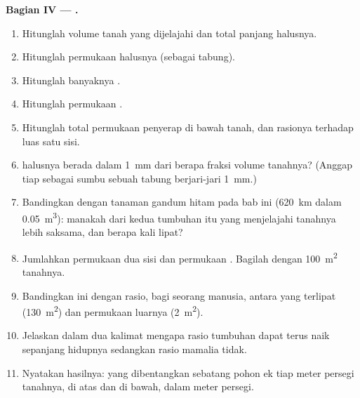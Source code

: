 \begin{problem}
\medskip
\noindent\textbf{Bagian IV --- .}
\begin{enumerate}[resume]
  \item Hitunglah volume tanah yang dijelajahi dan total panjang 
        halusnya.
  \item Hitunglah permukaan  halusnya (sebagai tabung).
  \item Hitunglah banyaknya .
  \item Hitunglah permukaan .
  \item Hitunglah total permukaan penyerap di bawah tanah, dan
        rasionya terhadap luas  satu sisi.
  \item {} halusnya berada dalam \qty{1}{mm} dari berapa fraksi
        volume tanahnya? (Anggap tiap  sebagai sumbu sebuah tabung
        berjari-jari \qty{1}{mm}.)
  \item Bandingkan dengan tanaman gandum hitam pada bab ini
        (\qty{620}{km}  dalam \qty{0.05}{m^3}): manakah dari kedua
        tumbuhan itu yang menjelajahi tanahnya lebih saksama, dan
        berapa kali lipat?
  \item Jumlahkan permukaan  dua sisi dan permukaan .
        Bagilah dengan \qty{100}{m^2} tanahnya.
  \item Bandingkan ini dengan rasio, bagi seorang manusia, antara
         yang terlipat (\qty{130}{m^2}) dan
        permukaan luarnya
        (\qty{2}{m^2}).
  \item Jelaskan dalam dua kalimat mengapa rasio tumbuhan dapat terus
        naik sepanjang hidupnya sedangkan rasio mamalia tidak.
  \item Nyatakan hasilnya:  yang dibentangkan
        sebatang pohon ek tiap meter persegi tanahnya, di atas dan di
        bawah, dalam meter persegi.
\end{enumerate}
\end{problem}
